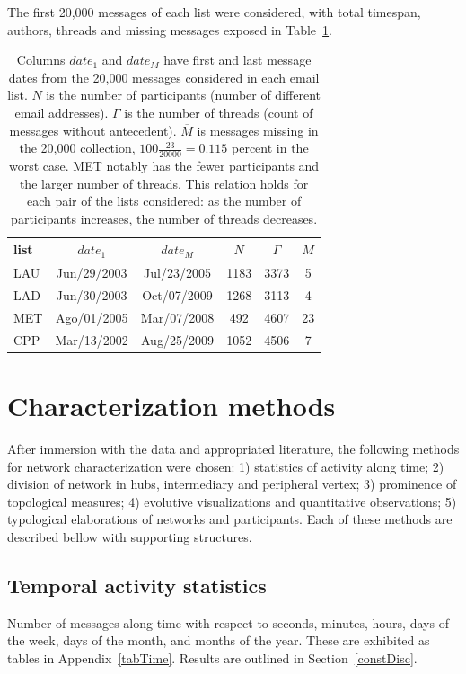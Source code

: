 \documentclass[%
 aip,
 jmp,%
 amsmath,amssymb,
 reprint,%
]{revtex4-1}
\begin{document}
 The first 20,000 messages of each list were considered, with total timespan, authors, threads and missing messages exposed in Table~\ref{geralListas}.

\begin{table}
  \centering
  \caption{Columns $date_1$ and $date_M$ have first and last message dates from the 20,000 messages considered in each email list.
$N$ is the number of participants (number of different email addresses).
$\Gamma$ is the number of threads (count of messages without antecedent).
$\overline{M}$ is messages missing in the 20,000 collection, $100\frac{23}{20000}=0.115$ percent in the worst case.
MET notably has the fewer participants and the larger number of threads.
This relation holds for each pair of the lists considered: as the number of participants increases,
 the number of threads decreases.}
  \label{geralListas}
  \begin{tabular}{|l|c|c|c|c|c|}\hline
list & $date_1$ & $date_{M}$    & $N$  & $\Gamma$ & $\overline{M}$ \\\hline
LAU  & Jun/29/2003 & Jul/23/2005 & 1183 & 3373 & 5 \\
LAD  & Jun/30/2003 & Oct/07/2009 & 1268 & 3113 & 4 \\
MET  & Ago/01/2005 & Mar/07/2008 & 492  & 4607 & 23 \\
CPP  & Mar/13/2002 & Aug/25/2009 & 1052 & 4506 & 7 \\ \hline
  \end{tabular}
\end{table}



\section{Characterization methods}
After immersion with the data and appropriated literature, the following methods for network characterization were chosen: 1) statistics of activity along time; 2) division of network in hubs, intermediary and peripheral vertex; 3) prominence of topological measures; 4) evolutive visualizations and quantitative observations; 5) typological elaborations of networks and participants.
Each of these methods are described bellow with supporting structures.

    \subsection{Temporal activity statistics}
Number of messages along time with respect to seconds, minutes, hours, days of the week, days of the month, and months of the year. These are exhibited as tables in Appendix~\ref{tabTime}. Results are outlined in Section~\ref{constDisc}.
\end{document}
